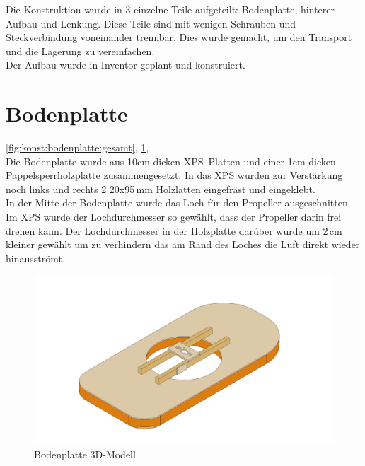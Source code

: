 Die Konstruktion wurde in 3 einzelne Teile aufgeteilt: Bodenplatte, hinterer Aufbau und Lenkung. Diese Teile sind mit wenigen Schrauben und Steckverbindung voneinander trennbar. Dies wurde gemacht, um den Transport und die Lagerung zu vereinfachen.\\
Der Aufbau wurde in Inventor geplant und konstruiert.


\newpage
\section{Bodenplatte}
\autoref{fig:konst:bodenplatte:gesamt}, \ref{fig:konst:bodenplatte:gesamt}, \pageref{fig:bodenplatte:skizze:BodenplattePappel}\\
Die Bodenplatte wurde aus 10cm dicken XPS--Platten und einer 1cm dicken Pappelsperrholzplatte zusammengesetzt. In das XPS wurden zur Verstärkung noch links und rechts 2 20x95\,mm Holzlatten eingefräst und eingeklebt.\\ 
In der Mitte der Bodenplatte wurde das Loch für den Propeller ausgeschnitten. Im XPS wurde der Lochdurchmesser so gewählt, dass der Propeller darin frei drehen kann. Der Lochdurchmesser in der Holzplatte darüber wurde um 2\,cm kleiner gewählt um zu verhindern das am Rand des Loches die Luft direkt wieder hinausströmt.

\begin{figure}[H]
    \centering
    \includegraphics[width=\textwidth]{../../../../Inventor/Bodenplatte/png/BodenplatteHauptansicht.png}
    \caption{Bodenplatte 3D-Modell\label{fig:konst:bodenplatte:gesamt}}
\end{figure}

